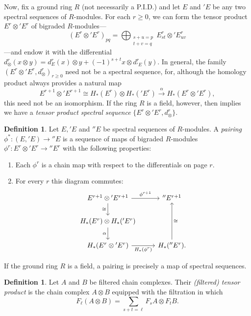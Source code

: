 \documentclass[a4paper, 11 pt, oneside, reqno]{amsart}
\numberwithin{lemma}{section}
\theoremstyle{definition}
\newtheorem{definition}[lemma]{Definition}
\newcommand{\demph}[1]{\emph{#1}}
\newcommand{\xto}{\xrightarrow}
\begin{document}
Now, fix a ground ring \(R\) (not necessarily a P.I.D.) and let \(E\) and \({}'E\) be any two spectral sequences of \(R\)-modules. For each \(r \geq 0\), we can form the tensor product \(E^r \otimes {}'E^r\) of bigraded \(R\)-modules---
\[(E^r \otimes {}'E^r)_{pq} = \bigoplus_{\substack{s+u=p \\ t+v = q}} E^r_{st} \otimes {}'E^r_{uv}\]
---and endow it with the differential \(d^r_\otimes(x \otimes y) = d_E^r(x) \otimes y + (-1)^{s+t} x \otimes d_{{}'E}^r(y)\). In general, the family \((E^r \otimes {}'E^r, d_\otimes^r)_{r \geq 0}\) need not be a spectral sequence, for, although the homology product always provides a natural map
\[
E^{r+1} \otimes {}'E^{r+1} \cong H_\ast(E^r) \otimes H_\ast ({}'E^r) \xto{\alpha} H_\ast(E^r \otimes {}'E^r),
\]
this need not be an isomorphism. If the ring \(R\) is a field, however, then  implies we have a \demph{tensor product spectral sequence} \(\{E^r \otimes {}'E^r, d_\otimes^r\}\).

\begin{definition}
    Let \(E, {}'E\) and \({}''E\) be spectral sequences of \(R\)-modules. A \demph{pairing}
    \(\phi^\ast\colon (E,{}'E) \to {}''E\)
    is a sequence of maps of bigraded \(R\)-modules \(\phi^r\colon E^r \otimes {}'E^r \to {}''E^r\) with the following properties:
    \begin{enumerate}
        \item Each \(\phi^r\) is a chain map with respect to the differentials on page \(r\).
        \item For every \(r\) this diagram commutes:
        \[
        \begin{tikzcd}
        E^{r+1} \otimes {}'E^{r+1} \arrow{r}{\phi^{r+1}} \arrow[swap]{d}{\cong} & {}''E^{r+1} \\
        H_\ast(E^r) \otimes H_\ast({}'E^r) \arrow[swap]{d}{\alpha} \\
        H_\ast(E^r \otimes {}'E^r) \arrow[swap]{r}{H_\ast(\phi^r)} & H_\ast({}''E^r) \arrow[swap]{uu}{\cong}.
        \end{tikzcd}
        \]
    \end{enumerate}
    If the ground ring \(R\) is a field, a pairing is precisely a map of spectral sequences.
\end{definition}

\begin{definition}
    Let \(A\) and \(B\) be filtered chain complexes. Their \demph{(filtered) tensor product} is the chain complex \(A \otimes B\) equipped with the filtration in which
    \[F_\ell (A \otimes B) = \sum_{s+t=\ell} F_s A \otimes F_t B.\]
\end{definition}
\end{document}
